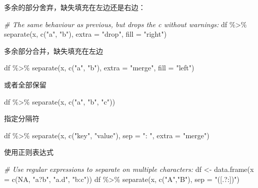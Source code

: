 \documentclass[
]{book}
\newenvironment{Shaded}{\begin{snugshade}}{\end{snugshade}}
\newcommand{\AttributeTok}[1]{\textcolor[rgb]{0.77,0.63,0.00}{#1}}
\newcommand{\CommentTok}[1]{\textcolor[rgb]{0.56,0.35,0.01}{\textit{#1}}}
\newcommand{\ConstantTok}[1]{\textcolor[rgb]{0.00,0.00,0.00}{#1}}
\newcommand{\FunctionTok}[1]{\textcolor[rgb]{0.00,0.00,0.00}{#1}}
\newcommand{\NormalTok}[1]{#1}
\newcommand{\OtherTok}[1]{\textcolor[rgb]{0.56,0.35,0.01}{#1}}
\newcommand{\SpecialCharTok}[1]{\textcolor[rgb]{0.00,0.00,0.00}{#1}}
\newcommand{\StringTok}[1]{\textcolor[rgb]{0.31,0.60,0.02}{#1}}
\begin{document}
多余的部分舍弃，缺失填充在左边还是右边：

\begin{Shaded}
\begin{Highlighting}[]
\CommentTok{\# The same behaviour as previous, but drops the c without warnings:}
\NormalTok{df }\SpecialCharTok{\%\textgreater{}\%} \FunctionTok{separate}\NormalTok{(x, }\FunctionTok{c}\NormalTok{(}\StringTok{"a"}\NormalTok{, }\StringTok{"b"}\NormalTok{), }\AttributeTok{extra =} \StringTok{"drop"}\NormalTok{, }\AttributeTok{fill =} \StringTok{"right"}\NormalTok{)}
\end{Highlighting}
\end{Shaded}

多余部分合并，缺失填充在左边

\begin{Shaded}
\begin{Highlighting}[]
\NormalTok{df }\SpecialCharTok{\%\textgreater{}\%} \FunctionTok{separate}\NormalTok{(x, }\FunctionTok{c}\NormalTok{(}\StringTok{"a"}\NormalTok{, }\StringTok{"b"}\NormalTok{), }\AttributeTok{extra =} \StringTok{"merge"}\NormalTok{, }\AttributeTok{fill =} \StringTok{"left"}\NormalTok{)}
\end{Highlighting}
\end{Shaded}

或者全部保留

\begin{Shaded}
\begin{Highlighting}[]
\NormalTok{df }\SpecialCharTok{\%\textgreater{}\%} \FunctionTok{separate}\NormalTok{(x, }\FunctionTok{c}\NormalTok{(}\StringTok{"a"}\NormalTok{, }\StringTok{"b"}\NormalTok{, }\StringTok{"c"}\NormalTok{))}
\end{Highlighting}
\end{Shaded}

指定分隔符

\begin{Shaded}
\begin{Highlighting}[]
\NormalTok{df }\SpecialCharTok{\%\textgreater{}\%} \FunctionTok{separate}\NormalTok{(x, }\FunctionTok{c}\NormalTok{(}\StringTok{"key"}\NormalTok{, }\StringTok{"value"}\NormalTok{), }\AttributeTok{sep =} \StringTok{": "}\NormalTok{, }\AttributeTok{extra =} \StringTok{"merge"}\NormalTok{)}
\end{Highlighting}
\end{Shaded}

使用正则表达式

\begin{Shaded}
\begin{Highlighting}[]
\CommentTok{\# Use regular expressions to separate on multiple characters:}
\NormalTok{df }\OtherTok{\textless{}{-}} \FunctionTok{data.frame}\NormalTok{(}\AttributeTok{x =} \FunctionTok{c}\NormalTok{(}\ConstantTok{NA}\NormalTok{, }\StringTok{"a?b"}\NormalTok{, }\StringTok{"a.d"}\NormalTok{, }\StringTok{"b:c"}\NormalTok{))}
\NormalTok{df }\SpecialCharTok{\%\textgreater{}\%} \FunctionTok{separate}\NormalTok{(x, }\FunctionTok{c}\NormalTok{(}\StringTok{"A"}\NormalTok{,}\StringTok{"B"}\NormalTok{), }\AttributeTok{sep =} \StringTok{"([.?:])"}\NormalTok{)}
\end{Highlighting}
\end{Shaded}
\end{document}

